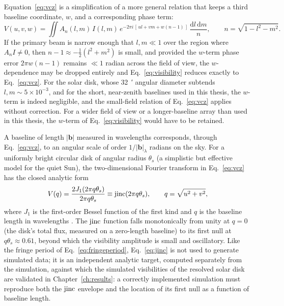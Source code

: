 Equation~\eqref{eq:vcz} is a simplification of a more general relation that
keeps a third baseline coordinate, $w$, and a corresponding phase term:
\begin{equation}
  V(u,v,w) = \iint A_n(l,m)\,I(l,m)\,
  e^{-2\pi i\,[\,ul + vm + w(n-1)\,]}\,
  \frac{\mathrm{d}l\,\mathrm{d}m}{n},
  \qquad n=\sqrt{1-l^2-m^2} .
  \label{eq:visibility}
\end{equation}
If the primary beam is narrow enough that $l,m\ll1$ over the region where
$A_nI\neq0$, then $n-1\approx-\tfrac12(l^2+m^2)$ is small, and provided the
$w$-term phase error $2\pi w(n-1)$ remains $\ll1$ radian across the field of
view, the $w$-dependence may be dropped entirely and Eq.~\eqref{eq:visibility}
reduces exactly to Eq.~\eqref{eq:vcz}. For the solar disk, whose
\SI{32}{\arcminute} angular diameter subtends $l,m\sim5\times10^{-3}$, and for
the short, near-zenith baselines used in this thesis, the $w$-term is indeed
negligible, and the small-field relation of Eq.~\eqref{eq:vcz} applies without
correction. For a wider field of view or a longer-baseline array than used in
this thesis, the $w$-term of Eq.~\eqref{eq:visibility} would have to be
retained.

A baseline of length $|\bm{b}|$ measured in wavelengths corresponds, through
Eq.~\eqref{eq:vcz}, to an angular scale of order $1/|\bm{b}|_\lambda$ radians
on the sky. For a uniformly bright circular disk of angular radius
$\theta_s$ (a simplistic but effective model for the quiet Sun), the
two-dimensional Fourier transform in Eq.~\eqref{eq:vcz} has the closed
analytic form
\begin{equation}
  V(q) = \frac{2 J_1(2\pi q \theta_s)}{2\pi q \theta_s} \equiv \operatorname{jinc}(2\pi q\theta_s),
  \qquad q=\sqrt{u^2+v^2},
  \label{eq:jinc}
\end{equation}
where $J_1$ is the first-order Bessel function of the first kind and $q$ is
the baseline length in wavelengths \citep{tms2017,taylor1999synthesis}. The
$\operatorname{jinc}$ function falls monotonically from unity at $q=0$ (the disk's total
flux, measured on a zero-length baseline) to its first null at
$q\theta_s\approx0.61$, beyond which the visibility amplitude is small and
oscillatory. Like the fringe period of Eq.~\eqref{eq:fringeperiod},
Eq.~\eqref{eq:jinc} is not used to generate simulated data; it is an
independent analytic target, computed separately from the simulation, against
which the simulated visibilities of the resolved solar disk are validated in
Chapter~\ref{ch:results}: a correctly implemented simulation must reproduce
both the $\operatorname{jinc}$ envelope and the location of its first null as a function of
baseline length.

